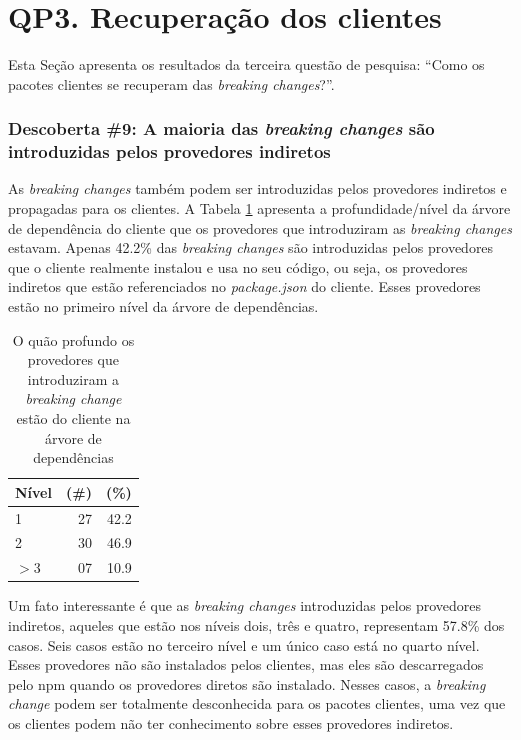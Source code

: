 \section{QP3. Recuperação dos clientes}
\label{sec:qp3:results}

Esta Seção apresenta os resultados da terceira questão de pesquisa: ``Como os pacotes clientes se recuperam das \textit{breaking changes}?''.

\subsubsection{Descoberta \#9: A maioria das \textit{breaking changes} são introduzidas pelos provedores indiretos}

As \textit{breaking changes} também podem ser introduzidas pelos provedores indiretos e propagadas para os clientes. A Tabela \ref{tab:dependency_tree_deep} apresenta a profundidade/nível da árvore de dependência do cliente que os provedores que introduziram as \textit{breaking changes} estavam. Apenas 42.2\% das \textit{breaking changes} são introduzidas pelos provedores que o cliente realmente instalou e usa no seu código, ou seja, os provedores indiretos que estão referenciados no \textit{package.json} do cliente. Esses provedores estão no primeiro nível da árvore de dependências.

\begin{table}
	\centering
	\caption{O quão profundo os provedores que introduziram a \textit{breaking change} estão do cliente na árvore de dependências}
	\begin{tabular}{lrr}
		\toprule
		\textbf{Nível} & \textbf{(\#)} & \textbf{(\%)} \\ \hline
		1              & 27            & 42.2          \\
		2              & 30            & 46.9          \\
		$>$3           & 07            & 10.9          \\ \bottomrule
	\end{tabular}
	\label{tab:dependency_tree_deep}
\end{table}

Um fato interessante é que as \textit{breaking changes} introduzidas pelos provedores indiretos, aqueles que estão nos níveis dois, três e quatro, representam 57.8\% dos casos. Seis casos estão no terceiro nível e um único caso está no quarto nível. Esses provedores não são instalados pelos clientes, mas eles são descarregados pelo \textsf{npm} quando os provedores diretos são instalado. Nesses casos, a \textit{breaking change} podem ser totalmente desconhecida para os pacotes clientes, uma vez que os clientes podem não ter conhecimento sobre esses provedores indiretos.

